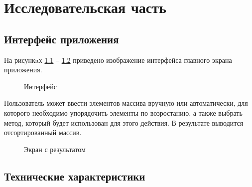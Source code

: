 \chapter{Исследовательская часть}

\section{Интерфейс приложения}

На рисункaх  \ref{fig:interface} -- \ref{fig:working1} приведено изображение интерфейса главного экрана приложения.
\FloatBarrier
\begin{figure}[h!]
	\caption{Интерфейс}
	\label{fig:interface}
\end{figure}
\FloatBarrier

Пользователь может ввести элементов массива вручную или автоматически, для которого необходимо упорядочить элементы по возростанию, а также выбрать метод, который будет использован для этого действия. 
В результате выводится отсортированный массив.
\FloatBarrier
\begin{figure}[h!]
	\caption{Экран с результатом}
	\label{fig:working1}
\end{figure}
\clearpage

\section{Технические характеристики}

